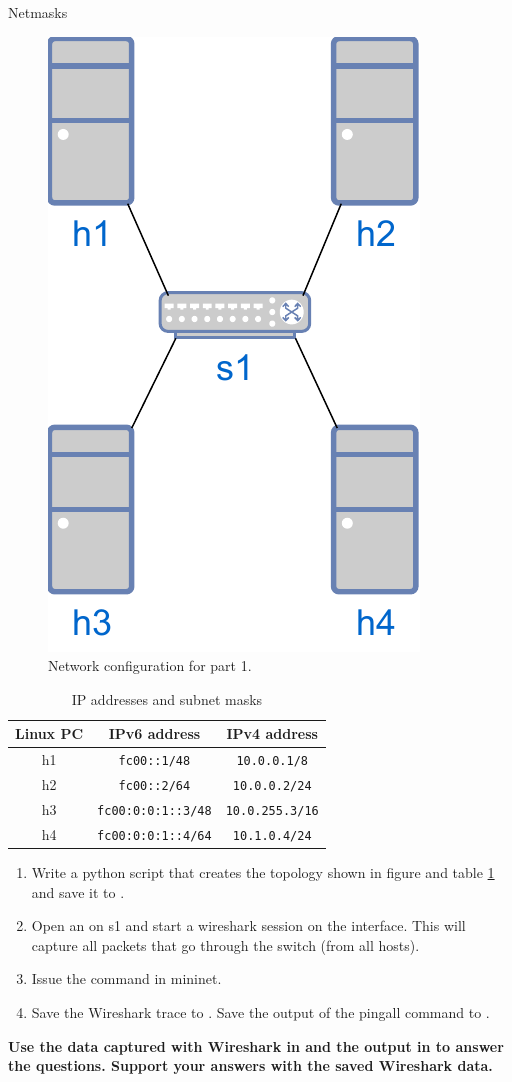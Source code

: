 \begin{exercise}{Netmasks}
	\begin{figure}[ht]
		\centering
		\includegraphics[width=.2\linewidth]{graphics/Lab3-Network1}	
		\caption{Network configuration for part 1.}
		\label{fig:lab3-network1}
	\end{figure}
\begin{table}[h!t]
\centering
\begin{tabular}{| c | c | c |}
    \hline
    \textbf{Linux} PC & \textbf{IPv6 address} & \textbf{IPv4 address} \\
    \hline
    h1 & \texttt{fc00::1/48} & \texttt{10.0.0.1/8} \\
    h2 & \texttt{fc00::2/64} & \texttt{10.0.0.2/24} \\
    h3 & \texttt{fc00:0:0:1::3/48} & \texttt{10.0.255.3/16} \\
    h4 & \texttt{fc00:0:0:1::4/64} & \texttt{10.1.0.4/24} \\
    \hline
\end{tabular}
\caption{IP addresses and subnet masks}
\label{tab:lab2-part7-addresses}
\end{table}

\begin{enumerate}
\item Write a python script that creates the topology shown in figure and table \ref{fig:lab3-network1} and save it to .
\item Open an  on s1 and start a wireshark session on the  interface. This will capture all packets that go through the switch (from all hosts).
\item Issue the  command in mininet.
\item Save the Wireshark trace to . Save the output of the pingall command to .
\end{enumerate}

\textbf{Use the data captured with Wireshark in  and the output in  to answer the questions. Support your answers with the saved Wireshark data.}

\end{exercise}

